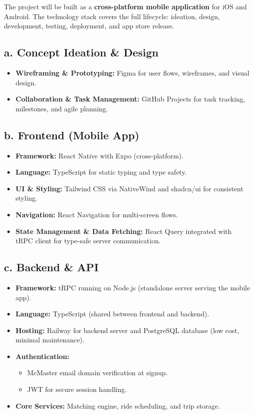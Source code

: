 \documentclass{article}
\begin{document}
The project will be built as a \textbf{cross-platform mobile application} for iOS and Android. The technology stack covers the full lifecycle: ideation, design, development, testing, deployment, and app store release.

\subsection*{a. Concept Ideation \& Design}
\begin{itemize}
    \item \textbf{Wireframing \& Prototyping:} Figma for user flows, wireframes, and visual design.
    \item \textbf{Collaboration \& Task Management:} GitHub Projects for task tracking, milestones, and agile planning.
\end{itemize}

\subsection*{b. Frontend (Mobile App)}
\begin{itemize}
    \item \textbf{Framework:} React Native with Expo (cross-platform).
    \item \textbf{Language:} TypeScript for static typing and type safety.
    \item \textbf{UI \& Styling:} Tailwind CSS via NativeWind and shadcn/ui for consistent styling.
    \item \textbf{Navigation:} React Navigation for multi-screen flows.
    \item \textbf{State Management \& Data Fetching:} React Query integrated with tRPC client for type-safe server communication.
\end{itemize}

\subsection*{c. Backend \& API}
\begin{itemize}
    \item \textbf{Framework:} tRPC running on Node.js (standalone server serving the mobile app).
    \item \textbf{Language:} TypeScript (shared between frontend and backend).
    \item \textbf{Hosting:} Railway for backend server and PostgreSQL database (low cost, minimal maintenance).
    \item \textbf{Authentication:} 
    \begin{itemize}
        \item McMaster email domain verification at signup.
        \item JWT for secure session handling.
    \end{itemize}
    \item \textbf{Core Services:} Matching engine, ride scheduling, and trip storage.
\end{itemize}
\end{document}
